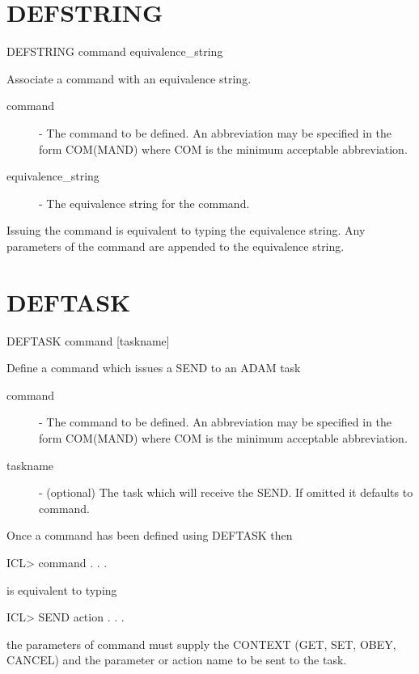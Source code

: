 \documentclass[twoside,11pt,nolof,chapters]{starlink}
\begin{document}
\section{DEFSTRING\label{DEFSTRING}}

   DEFSTRING \hspace{.5cm} command \hspace{.5cm} equivalence\_string

 Associate a command with an equivalence string.

\begin{description}

\item[command] - The command to be defined. An abbreviation
              may be specified in the form COM(MAND) where
              COM is the minimum acceptable abbreviation.

\item[equivalence\_string] - The equivalence string for the command.

\end{description}
Issuing the command is equivalent to typing the equivalence string. Any
parameters of the command are appended to the equivalence string.

\section{DEFTASK\label{DEFTASK}}

   DEFTASK \hspace{.5cm} command \hspace{.5cm} [taskname]

 Define a command which issues a SEND to an ADAM task

\begin{description}

\item[command] - The command to be defined. An abbreviation
              may be specified in the form COM(MAND) where
              COM is the minimum acceptable abbreviation.

\item[taskname] - (optional) The task which will receive the SEND.
              If omitted it defaults to command.

\end{description}
Once a command has been defined using DEFTASK then
\begin{terminalv}
    ICL> command . . .
\end{terminalv}
is equivalent to typing
\begin{terminalv}
    ICL> SEND action . . .
\end{terminalv}
the parameters of command must supply the CONTEXT (GET, SET, OBEY, CANCEL)
and the parameter or action name to be sent to the task.
\end{document}
